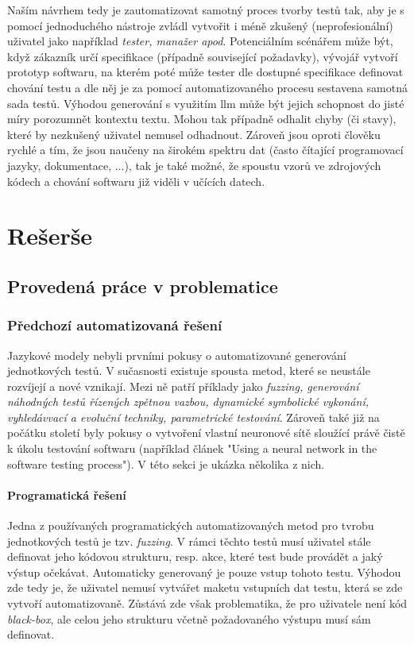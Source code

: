 \documentclass[czech, ma, kiv, he, iso690numb, pdf, viewonly]{fasthesis}
\begin{document}
    \pagebreak
    Naším návrhem tedy je zautomatizovat samotný proces tvorby testů tak, aby je s pomocí jednoduchého nástroje zvládl vytvořit i méně zkušený (neprofesionální) uživatel jako například \textit{tester, manažer apod}. Potenciálním scénářem může být, když zákazník určí specifikace (případně související požadavky), vývojář vytvoří prototyp softwaru, na kterém poté může tester dle dostupné specifikace definovat chování testu a dle něj je za pomocí automatizovaného procesu sestavena samotná sada testů. Výhodou generování s využitím \Gls{llm} může být jejich schopnost do jisté míry porozumnět kontextu textu. Mohou tak případně odhalit chyby (či stavy), které by nezkušený uživatel nemusel odhadnout. Zároveň jsou oproti člověku rychlé a tím, že jsou naučeny na širokém spektru dat (často čítající programovací jazyky, dokumentace, ...), tak je také možné, že spoustu vzorů ve zdrojových kódech a chování softwaru již viděli v učících datech.

\chapter{Rešerše} \label{sec:research}

    \section{Provedená práce v problematice} \label{sec:previouswork}
        \subsection{Předchozí automatizovaná řešení}
        Jazykové modely nebyli prvními pokusy o automatizované generování jednotkových testů. V sučasnosti existuje spousta metod, které se neustále rozvíjejí a nové vznikají. Mezi ně patří příklady jako \textit{fuzzing, generování náhodných testů řízených zpětnou vazbou, dynamické symbolické vykonání, vyhledávvací a evoluční techniky, parametrické testování}. Zároveň také již na počátku století byly pokusy o vytvoření vlastní neuronové sítě sloužící právě čistě k úkolu testování softwaru (například článek "Using a neural network in the software testing process"). \cite{Vanmali2002UsingAN} V této sekci je ukázka několika z nich. 

        \subsubsection{Programatická řešení}
        Jedna z používaných programatických automatizovaných metod pro tvrobu jednotkových testů je tzv. \textit{fuzzing}. V rámci těchto testů musí uživatel stále definovat jeho kódovou strukturu, resp. akce, které test bude provádět a jaký výstup očekávat. Automaticky generovaný je pouze vstup tohoto testu. Výhodou zde tedy je, že uživatel nemusí vytvářet maketu vstupních dat testu, která se zde vytvoří automatizovaně. Zůstává zde však problematika, že pro uživatele není kód \emph{black-box}, ale celou jeho strukturu včetně požadovaného výstupu musí sám definovat. \cite{fuzzing}
\end{document}
